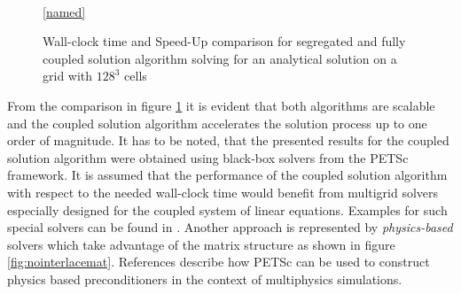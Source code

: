 \begin{figure}
  \begin{center}
    \\
  \ref{named}
  \end{center}
  \caption{Wall-clock time and Speed-Up comparison for segregated and fully coupled solution algorithm solving for an analytical solution on a grid with $128^3$ cells}
   \label{fig:speedup}
\end{figure}

From the comparison in figure \ref{fig:speedup} it is evident that both algorithms are scalable and the coupled solution algorithm accelerates the solution process up to one order of magnitude. It has to be noted, that the presented results for the coupled solution algorithm were obtained using black-box solvers from the PETSc framework. It is assumed that the performance of the coupled solution algorithm with respect to the needed wall-clock time would benefit from multigrid solvers especially designed for the coupled system of linear equations. Examples for such special solvers can be found in \cite{darwish09,mangani14,klaij13}. Another approach is represented by \emph{physics-based} solvers which take advantage of the matrix structure as shown in figure \ref{fig:nointerlacemat}. References \cite{brown12,mcinnes14} describe how PETSc can be used to construct physics based preconditioners in the context of multiphysics simulations.

